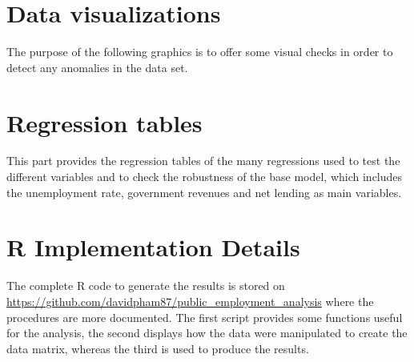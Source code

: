 \chapter{Data visualizations}
\label{ch:data-viz}
The purpose of the following graphics is to offer some visual checks in order
to detect any anomalies in the data set.

\begin{landscape}
\end{landscape}


\chapter{Regression tables}
\label{ch:reg-tbls}
This part provides the regression tables of the many regressions used to test
the different variables and to check the robustness of the base model, which
includes the unemployment rate, government revenues and net lending as main
variables.

\begin{landscape}








\end{landscape}


\chapter{R Implementation Details}
\label{app:complement}

The complete \textsf{R} code to generate the results is stored on
\url{https://github.com/davidpham87/public_employment_analysis} where the
procedures are more documented. The first script provides some functions useful
for the analysis, the second displays how the data were manipulated to create
the data matrix, whereas the third is used to produce the results.

